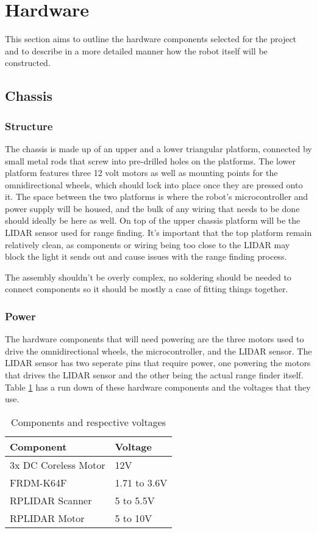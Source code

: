 	\section{Hardware}
	This section aims to outline the hardware components selected for the project and to describe in a more detailed manner how the robot itself will be constructed.
	
		\subsection{Chassis}
			\subsubsection{Structure}
			The chassis is made up of an upper and a lower triangular platform, connected by small metal rods that screw into pre-drilled holes on the platforms. The lower platform features three 12 volt motors as well as mounting points for the omnidirectional wheels, which should lock into place once they are pressed onto it. %
			The space between the two platforms is where the robot's microcontroller and power supply will be housed, and the bulk of any wiring that needs to be done should ideally be here as well. On top of the upper chassis platform will be the LIDAR sensor used for range finding. It's important that the top platform remain relatively clean, as components or wiring being too close to the LIDAR may block the light it sends out and cause issues with the range finding process.
			
			The assembly shouldn't be overly complex, no soldering should be needed to connect components so it should be mostly a case of fitting things together.
			
			\subsubsection{Power}
			The hardware components that will need powering are the three motors used to drive the omnidirectional wheels, the microcontroller, and the LIDAR sensor. The LIDAR sensor has two seperate pins that require power, one powering the motors that drives the LIDAR sensor and the other being the actual range finder itself. Table \ref{table:1} has a run down of these hardware components and the voltages that they use.
			
			\begin{table}[h!]
				\centering
				\begin{tabular}{|| l | l ||} 
					\hline
					Component & Voltage \\ [0.5ex] 
					\hline
					3x DC Coreless Motor  & 12V  \\ 
					FRDM-K64F  & 1.71 to 3.6V   \\
					RPLIDAR Scanner  & 5 to 5.5V  \\
					RPLIDAR Motor & 5 to 10V  \\ [1ex] 
					\hline
				\end{tabular}
				\caption{Components and respective voltages}
				\label{table:1}
			\end{table}
		
